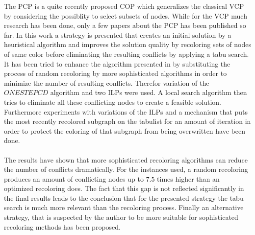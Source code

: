
The PCP is a quite recently proposed COP which generalizes the classical VCP by considering the possiblity to select subsets of nodes. While for the VCP much research has been done, only a few papers about the PCP has been published so far. In this work a strategy is presented that creates an initial solution by a heuristical algorithm and improves the solution quality by recoloring sets of nodes of same color before eliminating the resulting conflicts by applying a tabu search. It has been tried to enhance the algorithm presented in \cite{noronha-06} by substituting the process of random recoloring by more sophisticated algorithms in order to minimize the number of resulting conflicts. Therefor variation of the $ONESTEPCD$ algorithm \cite{li-00} and two ILPs were used. A local search algorithm then tries to eliminate all these conflicting nodes to create a feasible solution. Furthermore experiments with variations of the ILPs and a mechanism that puts the most recently recolored subgraph on the tabulist for an amount of iteration in order to protect the coloring of that subgraph from being overwritten have been done.\\\\
The results have shown that more sophisticated recoloring algorithms can reduce the number of conflicts dramatically. For the instances used, a random recoloring produces an amount of conflicting nodes up to $7.5$ times higher than an optimized recoloring does. The fact that this gap is not reflected significantly in the final results leads to the conclusion that for the presented strategy the tabu search is much more relevant than the recoloring process. Finally an alternative strategy, that is suspected by the author to be more suitable for sophisticated recoloring methods has been proposed.
